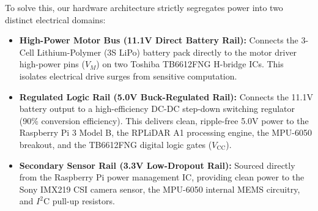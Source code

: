 \documentclass[11pt,a4paper]{article}
\begin{document}
To solve this, our hardware architecture strictly segregates power into two distinct electrical domains:
\begin{itemize}[noitemsep]
    \item \textbf{High-Power Motor Bus (11.1V Direct Battery Rail):} Connects the 3-Cell Lithium-Polymer (3S LiPo) battery pack directly to the motor driver high-power pins ($V_M$) on two Toshiba TB6612FNG H-bridge ICs. This isolates electrical drive surges from sensitive computation.
    \item \textbf{Regulated Logic Rail (5.0V Buck-Regulated Rail):} Connects the 11.1V battery output to a high-efficiency DC-DC step-down switching regulator (90\% conversion efficiency). This delivers clean, ripple-free 5.0V power to the Raspberry Pi 3 Model B, the RPLiDAR A1 processing engine, the MPU-6050 breakout, and the TB6612FNG digital logic gates ($V_{\text{CC}}$).
    \item \textbf{Secondary Sensor Rail (3.3V Low-Dropout Rail):} Sourced directly from the Raspberry Pi power management IC, providing clean power to the Sony IMX219 CSI camera sensor, the MPU-6050 internal MEMS circuitry, and $I^2$C pull-up resistors.
\end{itemize}
\end{document}
